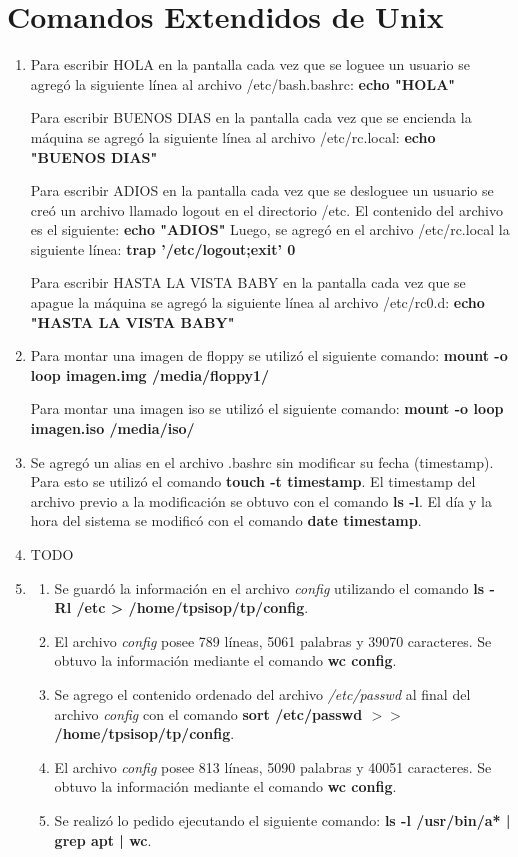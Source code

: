 \documentclass[a4paper,11pt] {article}
\begin{document}
\section{Comandos Extendidos de Unix}

\begin{enumerate}
	\item Para escribir HOLA en la pantalla cada vez que se loguee un usuario se agreg\'o la siguiente l\'inea al archivo 	/etc/bash.bashrc:
	\textbf{echo "HOLA"}
	
	Para escribir BUENOS DIAS en la pantalla cada vez que se encienda la m\'aquina se agreg\'o la siguiente l\'inea al 			archivo /etc/rc.local:
	\textbf{echo "BUENOS DIAS"}
	
	Para escribir ADIOS en la pantalla cada vez que se desloguee un usuario se cre\'o un archivo llamado logout en el 			directorio /etc. El contenido del archivo es el siguiente:
	\textbf{echo "ADIOS"}
	Luego, se agreg\'o en el archivo /etc/rc.local la siguiente l\'inea:
	\textbf{trap '/etc/logout;exit' 0}
	
	Para escribir HASTA LA VISTA BABY en la pantalla cada vez que se apague la m\'aquina se agreg\'o la siguiente l\'inea 	al archivo /etc/rc0.d:
	\textbf{echo "HASTA LA VISTA BABY"}
	
	\item Para montar una imagen de floppy se utiliz\'o el siguiente comando:
		\textbf{mount -o loop imagen.img /media/floppy1/}
		
		Para montar una imagen iso se utiliz\'o el siguiente comando:
		\textbf{mount -o loop imagen.iso /media/iso/}
		
	\item Se agreg\'o un alias en el archivo .bashrc sin modificar su fecha (timestamp). Para esto se utiliz\'o el comando \textbf{touch -t timestamp}. El timestamp del archivo previo a la modificaci\'on se obtuvo con el comando  \textbf{ls -l}.
	El d\'ia y la hora del sistema se modific\'o con el comando \textbf{date timestamp}.
	
	\item TODO
	\item
		\begin{enumerate}
			\item Se guard\'o la informaci\'on en el archivo \textit{config} utilizando el comando \textbf{ls -Rl /etc > /home/tpsisop/tp/config}.
			\item El archivo \textit{config} posee 789 l\'ineas, 5061 palabras y 39070 caracteres. Se obtuvo la informaci\'on mediante el comando \textbf{wc config}.
			\item Se agrego el contenido ordenado del archivo \textit{/etc/passwd} al final del archivo \textit{config} con el comando \textbf{sort /etc/passwd $>>$ /home/tpsisop/tp/config}.
			\item El archivo \textit{config} posee 813 l\'ineas, 5090 palabras y 40051 caracteres. Se obtuvo la informaci\'on mediante el comando \textbf{wc config}.
			\item Se realiz\'o lo pedido ejecutando el siguiente comando: \textbf{ls -l /usr/bin/a* | grep apt | wc}.
		\end{enumerate}
	
\end{enumerate}
\end{document}
